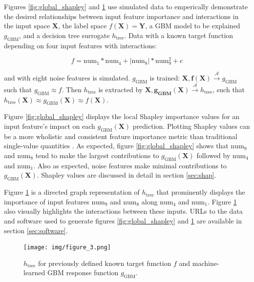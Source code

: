 \documentclass{article}
\begin{document}
Figures \ref{fig:global_shapley} and \ref{fig:dt_surrogate} use simulated data to emperically demonstrate the desired relationships between input feature importance and interactions in the input space $\mathbf{X}$, the label space $f(\mathbf{X}) = \mathbf{Y}$, a GBM model to be explained $g_{\text{GBM}}$, and a decision tree surrogate $h_{\text{tree}}$. Data with a known target function depending on four input features with interactions: 

\begin{equation}
\label{eq:f}
f = \text{num} _1 * \text{num}_4 + |\text{num}_8| * \text{num}_9^2 + e
\end{equation}

and with eight noise features is simulated. $g_{\text{GBM}}$ is trained: $ \mathbf{X}, \mathbf{f(X)} \xrightarrow{\mathcal{A}} g_{\text{GBM}}$ such that $g_{\text{GBM}} \approx f$. Then $h_{\text{tree}}$ is extracted by $\mathbf{X}, \mathbf{g_{\text{GBM}}(X)} \xrightarrow{\mathcal{A}} h_{\text{tree}}$, such that $h_{\text{tree}}(\mathbf{X}) \approx g_{\text{GBM}}(\mathbf{X}) \approx f(\mathbf{X})$.

Figure \ref{fig:global_shapley} displays the local Shapley importance values for an input feature's impact on each $g_{\text{GBM}}(\mathbf{X})$ prediction. Plotting Shapley values can be a more wholistic and consistent feature importance metric than traditional single-value quantities \cite{shapley}. As expected, figure \ref{fig:global_shapley} shows that $\text{num}_9$ and $\text{num}_8$ tend to make the largest contributions to $g_{\text{GBM}}(\mathbf{X})$ followed by $\text{num}_4$ and $\text{num}_1$. Also as expected, noise features make minimal contributions to $g_{\text{GBM}}(\mathbf{X})$. Shapley values are discussed in detail in section \ref{sec:shap}.

Figure \ref{fig:dt_surrogate} is a directed graph representation of $h_{\text{tree}}$ that prominently displays the importance of input features $\text{num}_9$ and $\text{num}_8$ along $\text{num}_4$ and $\text{num}_1$. Figure \ref{fig:dt_surrogate} also visually highlights the interactions between these inputs. URLs to the data and software used to generate figures \ref{fig:global_shapley} and \ref{fig:dt_surrogate} are available in section \ref{sec:software}.

\begin{figure}[htb]
	\begin{center}
		\texttt{[image: img/figure\_3.png]}
		\caption{$h_{\text{tree}}$ for previously defined known target function $f$ and machine-learned GBM response function $g_{\text{GBM}}$.}
		\label{fig:dt_surrogate}
	\end{center}
\end{figure}
\end{document}
